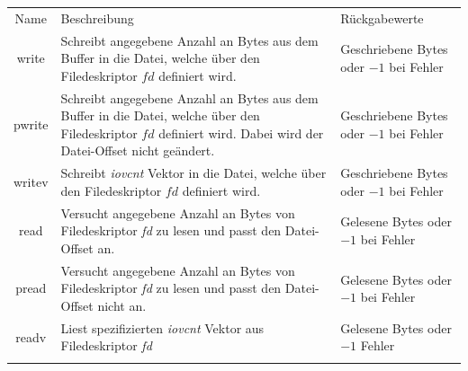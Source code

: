                     \begin{table}[ht]
                        \small
                        \centering
                        \begin{tabular}{cp{6cm}p{3cm}}
                            \hline
                            \rowcolor{GruvGray!36}
                            \multicolumn{3}{c}{System Calls}\\
                            \hline
                            Name & Beschreibung & Rückgabewerte\\
                            \hline
                            \hline
                            \rowcolor{GruvGray!16}
                            write   & Schreibt angegebene Anzahl an Bytes aus dem Buffer in die Datei, welche über den Filedeskriptor $fd$ definiert wird. & Geschriebene Bytes oder $-1$ bei Fehler\\
                            pwrite  & Schreibt angegebene Anzahl an Bytes aus dem Buffer in die Datei, welche über den Filedeskriptor $fd$ definiert wird. Dabei wird der Datei-Offset nicht geändert.& Geschriebene Bytes oder $-1$ bei Fehler\\
                            \rowcolor{GruvGray!16}
                            writev  & Schreibt \textit{iovcnt} Vektor in die Datei, welche über den Filedeskriptor $fd$ definiert wird.& Geschriebene Bytes oder $-1$ bei Fehler\\

                            read    & Versucht angegebene Anzahl an Bytes von Filedeskriptor \textit{fd} zu lesen und passt den Datei-Offset an.                                              & Gelesene Bytes oder $-1$ bei Fehler\\
                            \rowcolor{GruvGray!16}
                            pread   & Versucht angegebene Anzahl an Bytes von Filedeskriptor \textit{fd} zu lesen und passt den Datei-Offset nicht an.                                        & Gelesene Bytes oder $-1$ bei Fehler\\
                            readv   & Liest spezifizierten \textit{iovcnt} Vektor aus Filedeskriptor \textit{fd} & Gelesene Bytes oder $-1$ Fehler\\

                            \rowcolor{GruvGray!16}


\end{tabular}
\end{table}
